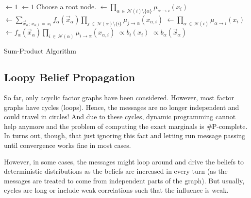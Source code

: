 		\begin{algorithm}  \DontPrintSemicolon
			 \( \gets 1 \) \;
			\( \gets 1 \) \;
			Choose a root node. \;
			 \( \gets \prod_{\alpha \,\in\, \mathcal{N}(i) \setminus \{ \alpha \}} \mu_{\alpha \to i}(x_i) \) \;
			 \( \gets \sum_{\vec{x}_\alpha;\, x_{\alpha, i} \,=\, x_i} f_\alpha(\vec{x}_\alpha) \prod_{j \,\in\, \mathcal{N}(\alpha) \setminus \{ i \}} \mu_{j \to \alpha}(x_{\alpha, i}) \) \;
			 \( \gets \prod_{\alpha \,\in\, \mathcal{N}(i)} \mu_{\alpha \to i}(x_i) \) \;
			 \( \gets f_\alpha(\vec{x}_\alpha) \prod_{i \,\in\, \mathcal{N}(\alpha)} \mu_{i \to \alpha}(x_{\alpha, i}) \) \;
			 \( \propto b_i(x_i) \) \;
			 \( \propto b_\alpha(\vec{x}_\alpha) \) \;
			\caption{Sum-Product Algorithm}
			\label{alg:spa}
		\end{algorithm}


		\subsection{Loopy Belief Propagation}
			\label{subsec:loopyBelief}

			So far, only acyclic factor graphs have been considered. However, most factor graphs have cycles (loops). Hence, the messages are no longer independent and could travel in circles! And due to these cycles, dynamic programming cannot help anymore and the problem of computing the exact marginals is \#P-complete. In turns out, though, that just ignoring this fact and letting run message passing until convergence works fine in most cases.

			However, in some cases, the messages might loop around and drive the beliefs to deterministic distributions as the beliefs are increased in every turn (as the messages are treated to come from independent parts of the graph). But usually, cycles are long or include weak correlations such that the influence is weak.

